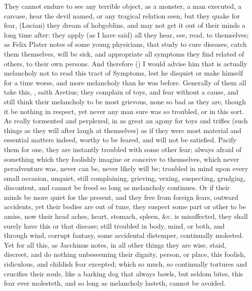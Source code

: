 {They cannot endure to see any terrible object, as a monster, a man
executed, a carcase, hear the devil named, or any tragical relation
seen, but they quake for fear,  (Lucian)
they dream of hobgoblins, and may not get it out of their minds a long
time after: they apply (as I have said) all they hear, see, read, to
themselves; as Felix Plater notes of some young physicians, that
study to cure diseases, catch them themselves, will be sick, and
appropriate all symptoms they find related of others, to their own
persons. And therefore () I would advise him that is actually melancholy not to read
this tract of Symptoms, lest he disquiet or make himself for a time
worse, and more melancholy than he was before. Generally of them all
take this, , saith Aretius;
they complain of toys, and fear without a cause, and still think
their melancholy to be most grievous, none so bad as they are, though
it be nothing in respect, yet never any man sure was so troubled, or in
this sort. As really tormented and perplexed, in as great an agony for
toys and trifles (such things as they will after laugh at themselves)
as if they were most material and essential matters indeed, worthy to
be feared, and will not be satisfied. Pacify them for one, they are
instantly troubled with some other fear; always afraid of something
which they foolishly imagine or conceive to themselves, which never
peradventure was, never can be, never likely will be; troubled in mind
upon every small occasion, unquiet, still complaining, grieving,
vexing, suspecting, grudging, discontent, and cannot be freed so long
as melancholy continues. Or if their minds be more quiet for the
present, and they free from foreign fears, outward accidents, yet their
bodies are out of tune, they suspect some part or other to be amiss,
now their head aches, heart, stomach, spleen, \&c. is misaffected, they
shall surely have this or that disease; still troubled in body, mind,
or both, and through wind, corrupt fantasy, some accidental distemper,
continually molested. Yet for all this, as Jacchinus notes, in
all other things they are wise, staid, discreet, and do nothing
unbeseeming their dignity, person, or place, this foolish, ridiculous,
and childish fear excepted; which so much, so continually tortures and
crucifies their souls, like a barking dog that always bawls, but seldom
bites, this fear ever molesteth, and so long as melancholy lasteth,
cannot be avoided.

}
